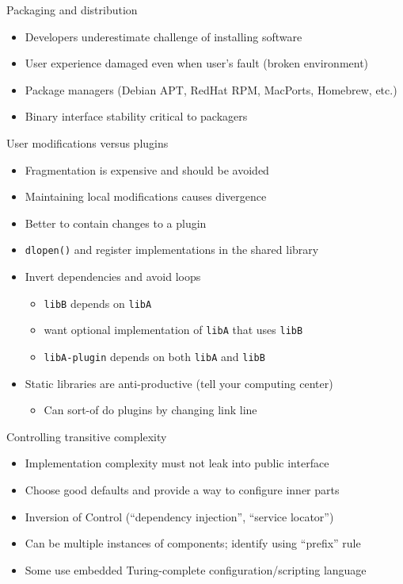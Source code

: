 \documentclass{beamer}
\begin{document}
\begin{frame}{Packaging and distribution}
  \begin{itemize}
  \item Developers underestimate challenge of installing software
  \item User experience damaged even when user's fault (broken environment)
  \item Package managers (Debian APT, RedHat RPM, MacPorts, Homebrew, etc.)
  \item Binary interface stability critical to packagers
  \end{itemize}
\end{frame}

\begin{frame}{User modifications versus plugins}
  \begin{itemize}
  \item Fragmentation is expensive and should be avoided
  \item Maintaining local modifications causes divergence
  \item Better to contain changes to a plugin
  \item \texttt{dlopen()} and register implementations in the shared library
  \item Invert dependencies and avoid loops
    \begin{itemize}
    \item \texttt{libB} depends on \texttt{libA}
    \item want optional implementation of \texttt{libA} that uses \texttt{libB}
    \item \texttt{libA-plugin} depends on both \texttt{libA} and \texttt{libB}
    \end{itemize}
  \item Static libraries are anti-productive (tell your computing center)
    \begin{itemize}
    \item Can sort-of do plugins by changing link line
    \end{itemize}
  \end{itemize}
\end{frame}

\begin{frame}{Controlling transitive complexity}
  \begin{itemize}
  \item Implementation complexity must not leak into public interface
  \item Choose good defaults and provide a way to configure inner parts
  \item Inversion of Control (``dependency injection'', ``service locator'')
  \item Can be multiple instances of components; identify using ``prefix'' rule
  \item Some use embedded Turing-complete configuration/scripting language
  \end{itemize}
\end{frame}
\end{document}
